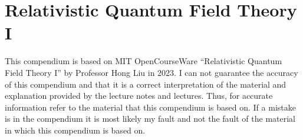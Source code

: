 \chapter{Relativistic Quantum Field Theory I}
This compendium is based on MIT OpenCourseWare ``Relativistic Quantum Field Theory I'' by Professor Hong Liu in 2023.
I can not guarantee the accuracy of this compendium and that it is a correct interpretation of the material and explanation provided by the lecture notes and lectures. Thus, for accurate information refer to the material that this compendium is based on. If a mistake is in the compendium it is most likely my fault and not the fault of the material in which this compendium is based on.


